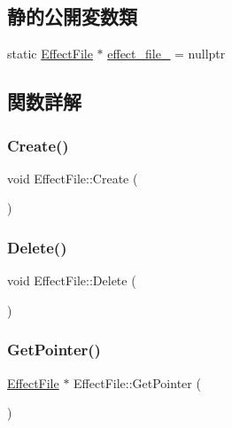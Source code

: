 \subsection*{静的公開変数類}
\begin{DoxyCompactItemize}
\item 
static \mbox{\hyperlink{class_effect_file}{Effect\+File}} $\ast$ \mbox{\hyperlink{class_effect_file_ad6ff21f4dca6c548cdc57e8f73837086}{effect\+\_\+file\+\_\+}} = nullptr
\end{DoxyCompactItemize}


\subsection{関数詳解}
\mbox{\label{class_effect_file_a637faf44d3465e7fe8a665d339680ba8}} 
\subsubsection{\texorpdfstring{Create()}{Create()}}
{\footnotesize\ttfamily void Effect\+File\+::\+Create (\begin{DoxyParamCaption}{ }\end{DoxyParamCaption})\hspace{0.3cm}{\ttfamily [static]}}

\mbox{\label{class_effect_file_a0d9799f2ea38fa594b59e43183d70ce0}} 
\subsubsection{\texorpdfstring{Delete()}{Delete()}}
{\footnotesize\ttfamily void Effect\+File\+::\+Delete (\begin{DoxyParamCaption}{ }\end{DoxyParamCaption})\hspace{0.3cm}{\ttfamily [static]}}

\mbox{\label{class_effect_file_a0f61b1e53e67b28cb46f93b6ba20f941}} 
\subsubsection{\texorpdfstring{Get\+Pointer()}{GetPointer()}}
{\footnotesize\ttfamily \mbox{\hyperlink{class_effect_file}{Effect\+File}} $\ast$ Effect\+File\+::\+Get\+Pointer (\begin{DoxyParamCaption}{ }\end{DoxyParamCaption})\hspace{0.3cm}{\ttfamily [static]}}

